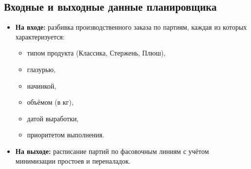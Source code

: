 \subsection{Входные и выходные данные планировщика}
\begin{itemize}
  \item \textbf{На входе:} разбивка производственного заказа по партиям, каждая из которых характеризуется:
  \begin{itemize}
    \item типом продукта (Классика, Стержень, Плюш),
    \item глазурью,
    \item начинкой,
    \item объёмом (в кг),
    \item датой выработки,
    \item приоритетом выполнения.
  \end{itemize}
  \item \textbf{На выходе:} расписание партий по фасовочным линиям с учётом минимизации простоев и переналадок.
\end{itemize}

